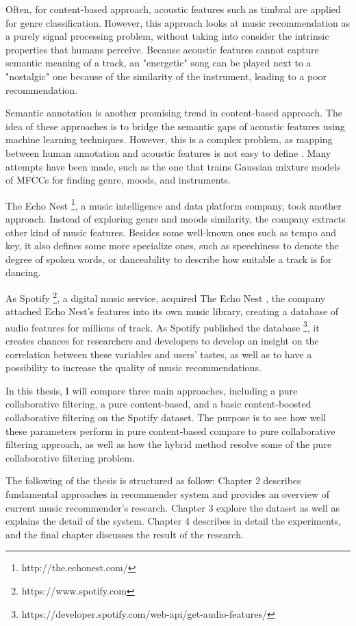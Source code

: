 Often, for content-based approach, acoustic features such as timbral are applied for genre classification. However, this approach looks at music recommendation as a purely signal processing problem, without taking into consider the intrinsic properties that humans perceive. Because acoustic features cannot capture semantic meaning of a track, an "energetic" song can be played next to a "nostalgic" one because of the similarity of the instrument, leading to a poor recommendation.

Semantic annotation is another promising trend in content-based approach. The idea of these approaches is to bridge the semantic gaps of acoustic features using machine learning techniques. However, this is a complex problem, as mapping between human annotation and acoustic features is not easy to define \cite{aucouturier2009sounds}. Many attempts have been made, such as the one that trains Gaussian mixture models of MFCCs for finding genre, moods, and instruments. 

The Echo Nest \footnote{http://the.echonest.com/}, a music intelligence and data platform company, took another approach. Instead of exploring genre and moods similarity, the company extracts other kind of music features. Besides some well-known ones such as tempo and key, it also defines some more specialize ones, such as speechiness to denote the degree of spoken words, or danceability to describe how suitable a track is for dancing. 

As Spotify \footnote{https://www.spotify.com}, a digital music service, acquired The Echo Nest \cite{press_2014}, the company attached Echo Nest's features into its own music library, creating a database of audio features for millions of track. As Spotify published the database \footnote{https://developer.spotify.com/web-api/get-audio-features/}, it creates chances for researchers and developers to develop an insight on the correlation between these variables and users' tastes, as well as to have a possibility to increase the quality of music recommendations.

In this thesis, I will compare three main approaches, including a pure collaborative filtering, a pure content-based, and a basic content-boosted collaborative filtering on the Spotify dataset. The purpose is to see how well these parameters perform in pure content-based compare to pure collaborative filtering approach, as well as how the hybrid method resolve some of the pure collaborative filtering problem. 

The following of the thesis is structured as follow: Chapter 2 describes fundamental approaches in recommender system and provides an overview of current music recommender's research. Chapter 3 explore the dataset as well as explains the detail of the system. Chapter 4 describes in detail the experiments, and the final chapter discusses the result of the research. 




